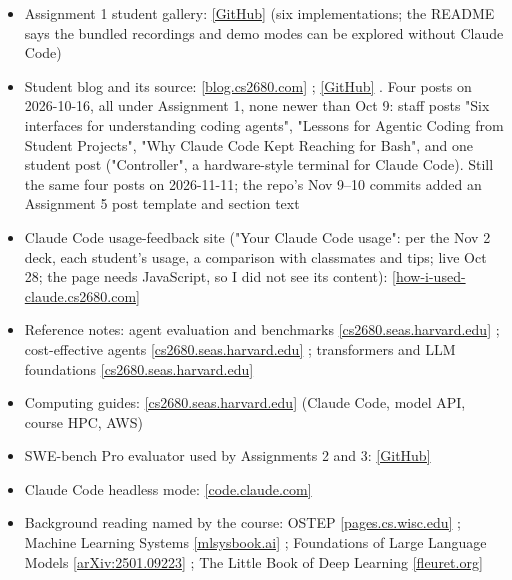 \documentclass[10pt,oneside]{report}
\begin{document}
{\begin{itemize}
\item Assignment 1 student gallery: \href{https://github.com/HarvardMadSys/CS2680-Assignment1-Mads-Lens}{[GitHub]} (six implementations; the README says the bundled recordings and demo modes can be explored without Claude Code)
\item Student blog and its source: \href{https://blog.cs2680.com/}{[blog.cs2680.com]} ; \href{https://github.com/HarvardMadSys/cs2680-blog}{[GitHub]} . Four posts on 2026-10-16, all under Assignment 1, none newer than Oct 9: staff posts "Six interfaces for understanding coding agents", "Lessons for Agentic Coding from Student Projects", "Why Claude Code Kept Reaching for Bash", and one student post ("Controller", a hardware-style terminal for Claude Code). Still the same four posts on 2026-11-11; the repo's Nov 9--10 commits added an Assignment 5 post template and section text
\item Claude Code usage-feedback site ("Your Claude Code usage": per the Nov 2 deck, each student's usage, a comparison with classmates and tips; live Oct 28; the page needs JavaScript, so I did not see its content): \href{https://how-i-used-claude.cs2680.com/}{[how-i-used-claude.cs2680.com]}
\item Reference notes: agent evaluation and benchmarks \href{https://cs2680.seas.harvard.edu/notes/agent-evaluation.html}{[cs2680.seas.harvard.edu]} ; cost-effective agents \href{https://cs2680.seas.harvard.edu/notes/cost-effective-agents.html}{[cs2680.seas.harvard.edu]} ; transformers and LLM foundations \href{https://cs2680.seas.harvard.edu/notes/transformers.html}{[cs2680.seas.harvard.edu]}
\item Computing guides: \href{https://cs2680.seas.harvard.edu/computing/index.html}{[cs2680.seas.harvard.edu]} (Claude Code, model API, course HPC, AWS)
\item SWE-bench Pro evaluator used by Assignments 2 and 3: \href{https://github.com/scaleapi/SWE-bench_Pro-os}{[GitHub]}
\item Claude Code headless mode: \href{https://code.claude.com/docs/en/headless}{[code.claude.com]}
\item Background reading named by the course: OSTEP \href{https://pages.cs.wisc.edu/\%7Eremzi/OSTEP/}{[pages.cs.wisc.edu]} ; Machine Learning Systems \href{https://mlsysbook.ai}{[mlsysbook.ai]} ; Foundations of Large Language Models \href{https://arxiv.org/abs/2501.09223}{[arXiv:2501.09223]} ; The Little Book of Deep Learning \href{https://fleuret.org/francois/lbdl.html}{[fleuret.org]}
\end{itemize}}
\end{document}
